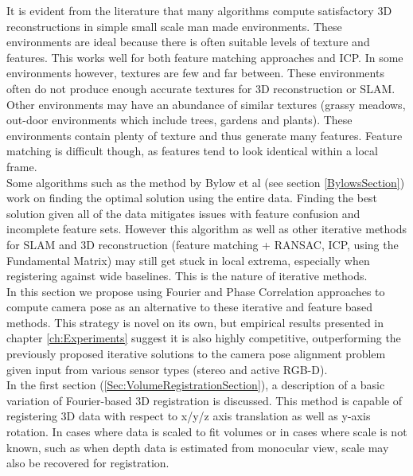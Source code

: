 
It is evident from the literature that many algorithms compute satisfactory 3D reconstructions in simple small scale man made environments. These environments are ideal because there is often suitable levels of texture and features. This works well for both feature matching approaches and ICP. In some environments however, textures are few and far between. These environments often do not produce enough accurate textures for 3D reconstruction or SLAM. \\

Other environments may have an abundance of similar textures (grassy meadows, out-door environments which include trees, gardens and plants). These environments contain plenty of texture and thus generate many features. Feature matching is difficult though, as features tend to look identical within a local frame. \\

Some algorithms such as the method by Bylow et al (see section \ref{BylowsSection}) work on finding the optimal solution using the entire data. Finding the best solution given all of the data mitigates issues with feature confusion and incomplete feature sets. However this algorithm as well as other iterative methods for SLAM and 3D reconstruction (feature matching + RANSAC, ICP, using the Fundamental Matrix) may still get stuck in local extrema, especially when registering against wide baselines. This is the nature of iterative methods. \\

In this section we propose using Fourier and Phase Correlation approaches to compute camera pose as an alternative to these iterative and feature based methods. This strategy is novel on its own, but empirical results presented in chapter \ref{ch:Experiments} suggest it is also highly competitive, outperforming the previously proposed iterative solutions to the camera pose alignment problem given input from various sensor types (stereo and active RGB-D). \\

In the first section (\ref{Sec:VolumeRegistrationSection}), a description of a basic variation of Fourier-based 3D registration is discussed. This method is capable of registering 3D data with respect to x/y/z axis translation as well as y-axis rotation. In cases where data is scaled to fit volumes or in cases where scale is not known, such as when depth data is estimated from monocular view, scale may also be recovered for registration. \\

